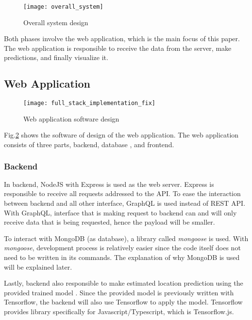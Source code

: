\documentclass[conference]{IEEEtran}
\begin{document}
\begin{figure}[htbp]
\centerline{\texttt{[image: overall\_system]}}
\caption{Overall system design}
\label{fig:overall_system}
\end{figure}

Both phases involve the web application, which is the main focus of this paper.
The web application is responsible to receive the data from the server,
make predictions, and finally visualize it. 

\subsection{Web Application}

\begin{figure}[htbp]
    \centerline{\texttt{[image: full\_stack\_implementation\_fix]}}
    \caption{Web application software design}
    \label{fig:full_stack_implementation_fix}
\end{figure}

Fig.\ref{fig:full_stack_implementation_fix} shows the software of design of the 
web application. The web application consists of three parts, backend, database
, and frontend. 

\subsubsection{Backend}
In backend, NodeJS with Express is used as the web server. Express is responsible
to receive all requests addressed to the API. To ease the interaction between
backend and all other interface, GraphQL is used instead of REST API. With 
GraphQL, interface that is making request to backend can and will only 
receive data that is being requested, hence the payload will be smaller.  

To interact with MongoDB (as database), a library called \textit{mongoose} is used. 
With \textit{mongoose}, development process is relatively easier since the code 
itself does not need to be written in its commands. The explanation of
why MongoDB is used will be explained later.

Lastly, backend also responsible to make estimated location prediction 
using the provided trained model \cite{Afif}. Since the provided model is previously 
written with Tensorflow, the backend will also use Tensorflow to apply the model.
Tensorflow provides library specifically for Javascript/Typescript, which is 
Tensorflow.js.
\end{document}
